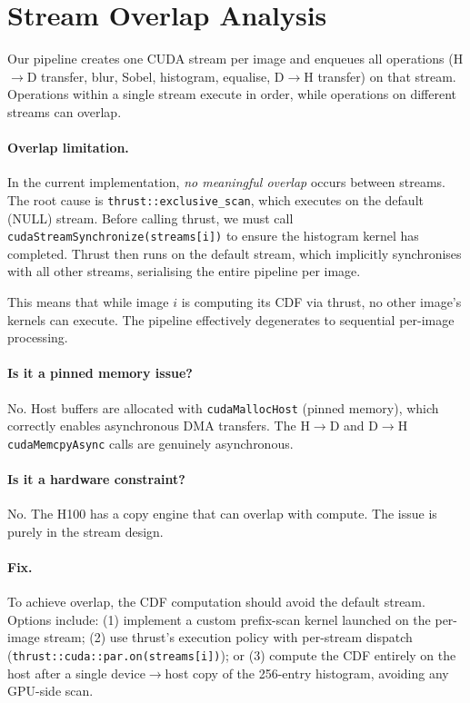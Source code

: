 \documentclass[
hf,
]{confart}
\begin{document}
\section{Stream Overlap Analysis}
\label{sec:streams}

Our pipeline creates one CUDA stream per image and enqueues all operations (H$\to$D transfer, blur, Sobel, histogram, equalise, D$\to$H transfer) on that stream. Operations within a single stream execute in order, while operations on different streams can overlap.

\paragraph{Overlap limitation.}
In the current implementation, \emph{no meaningful overlap} occurs between streams. The root cause is \texttt{thrust::exclusive\_scan}, which executes on the default (NULL) stream. Before calling thrust, we must call \texttt{cudaStreamSynchronize(streams[i])} to ensure the histogram kernel has completed. Thrust then runs on the default stream, which implicitly synchronises with all other streams, serialising the entire pipeline per image.

This means that while image $i$ is computing its CDF via thrust, no other image's kernels can execute. The pipeline effectively degenerates to sequential per-image processing.

\paragraph{Is it a pinned memory issue?}
No. Host buffers are allocated with \texttt{cudaMallocHost} (pinned memory), which correctly enables asynchronous DMA transfers. The H$\to$D and D$\to$H \texttt{cudaMemcpyAsync} calls are genuinely asynchronous.

\paragraph{Is it a hardware constraint?}
No. The H100 has a copy engine that can overlap with compute. The issue is purely in the stream design.

\paragraph{Fix.}
To achieve overlap, the CDF computation should avoid the default stream. Options include: (1) implement a custom prefix-scan kernel launched on the per-image stream; (2) use thrust's execution policy with per-stream dispatch (\texttt{thrust::cuda::par.on(streams[i])}); or (3) compute the CDF entirely on the host after a single device$\to$host copy of the 256-entry histogram, avoiding any GPU-side scan.
\end{document}
